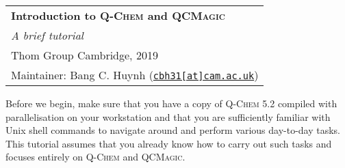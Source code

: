 \documentclass[%
	11pt,%
	oneside,%
	DIV=15,%
	BCOR=0mm,%
	headinclude=true,%
	footinclude=true,%
	parskip=half,%
	headsepline
]{scrartcl}
\begin{document}
	\vspace{1cm}
	\noindent
	\bgroup
	\renewcommand\arraystretch{1.5} \begin{tabular*}{\linewidth}{>{\centering\arraybackslash}m{\linewidth}}
		\hline
		\textbf{\Large Introduction to \textsc{Q-Chem} and \textsc{QCMagic}}\\
		\textit{\large A brief tutorial}\\
		\textcopyright Thom Group Cambridge, 2019\\[-8pt]
		Maintainer: Bang C. Huynh (\href{mailto:cbh31@cam.ac.uk}{\texttt{cbh31[at]cam.ac.uk}})\\
		\hline
	\end{tabular*}
	\egroup
	
	\setcounter{tocdepth}{2}
	\tableofcontents
	
	
	Before we begin, make sure that you have a copy of \textsc{Q-Chem} 5.2 compiled with parallelisation on your workstation and that you are sufficiently familiar with Unix shell commands to navigate around and perform various day-to-day tasks.
	This tutorial assumes that you already know how to carry out such tasks and focuses entirely on \textsc{Q-Chem} and \textsc{QCMagic}.
	
	\clearpage
	
	
\end{document}
